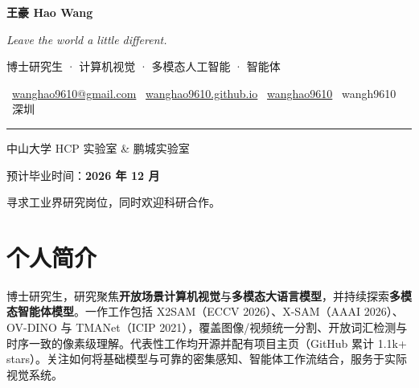 \documentclass[UTF8,10pt,letterpaper,fontset=fandol,linespread=1.15]{ctexart}
\newcommand{\sep}{{\color{rule}\;\textbar\;}}
\begin{document}
\begin{minipage}{\textwidth}
  \vspace{2pt}
  \centering
  {\rmfamily\fontsize{28}{32}\selectfont\bfseries\color{ink} 王豪\hspace{0.35em}%
   {\fontsize{20}{24}\selectfont\mdseries\color{muted} Hao Wang}}\par
  \vspace{5pt}
  {\rmfamily\itshape\large\color{muted} Leave the world a little different.}\par
  \vspace{4pt}
  {\normalsize\color{accent} 博士研究生 · 计算机视觉 · 多模态人工智能 · 智能体}\par
  \vspace{7pt}
  {\small\color{muted}
    \faEnvelope\ \href{mailto:wanghao9610@gmail.com}{wanghao9610@gmail.com}
    \sep
    \faGlobe\ \href{https://wanghao9610.github.io/}{wanghao9610.github.io}
    \sep
    \faGithub\ \href{https://github.com/wanghao9610}{wanghao9610}
    \sep
    \faWeixin\ wangh9610
    \sep
    \faMapMarker*\ 深圳
  }\par
  \vspace{7pt}
  {\color{ink}\rule{\linewidth}{0.8pt}}\par
  \vspace{5pt}
  \begin{minipage}[t]{0.62\textwidth}
    \RaggedRight\small\color{muted} 中山大学 HCP 实验室 \& 鹏城实验室
  \end{minipage}%
  \hfill
  \begin{minipage}[t]{0.36\textwidth}
    \RaggedLeft\small\color{muted} 预计毕业时间：\textbf{\color{accent}2026 年 12 月}
  \end{minipage}\par
  \vspace{1pt}
  {\small\color{muted}\RaggedRight 寻求工业界研究岗位，同时欢迎科研合作。\par}
\end{minipage}

\section{个人简介}
博士研究生，研究聚焦\textbf{开放场景计算机视觉}与\textbf{多模态大语言模型}，并持续探索\textbf{多模态智能体模型}。一作工作包括 X2SAM（ECCV 2026）、X-SAM（AAAI 2026）、OV-DINO 与 TMANet（ICIP 2021），覆盖图像/视频统一分割、开放词汇检测与时序一致的像素级理解。代表性工作均开源并配有项目主页（GitHub 累计 1.1k+ stars）。关注如何将基础模型与可靠的密集感知、智能体工作流结合，服务于实际视觉系统。
\end{document}
